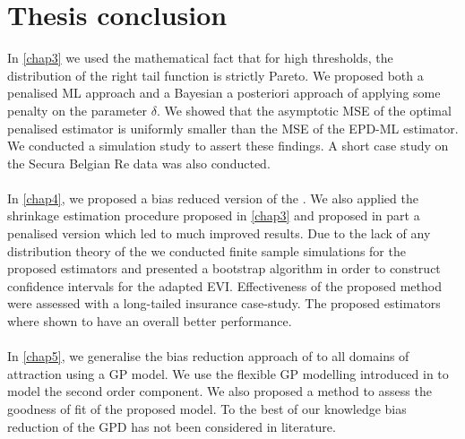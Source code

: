 \chapter{Thesis conclusion}\label{chap6}
In \autoref{chap3} we used the mathematical fact that for high thresholds, the distribution of the right tail function is strictly Pareto. We proposed both a penalised ML approach and a Bayesian a posteriori approach of applying some penalty on the parameter $\delta$. We showed that the asymptotic MSE of the optimal penalised estimator is uniformly smaller than the MSE of the EPD-ML estimator. We conducted a simulation study to assert these findings. A short case study on the Secura Belgian Re data was also conducted.
\\\\
In \autoref{chap4}, we proposed a bias reduced version of the \cite{worms2014new}. We also applied the shrinkage estimation procedure proposed in \autoref{chap3} and proposed in part a penalised version which led to much improved results. Due to the lack of any distribution theory of the \cite{worms2014new} we conducted finite sample simulations for the proposed estimators and presented a bootstrap algorithm in order to construct confidence intervals for the adapted EVI. Effectiveness of the proposed method were assessed with a long-tailed insurance case-study. The proposed estimators where shown to have an overall better performance.
\\\\
In \autoref{chap5}, we generalise the bias reduction approach of \cite{beirlant2009second} to all domains of attraction using a GP model. We use the flexible GP modelling introduced in \cite{tencaliec2018flexible} to model the second order component. We also proposed a method to assess the goodness of fit of the proposed model. To the best of our knowledge bias reduction of the GPD has not been considered in literature.
\\\\
